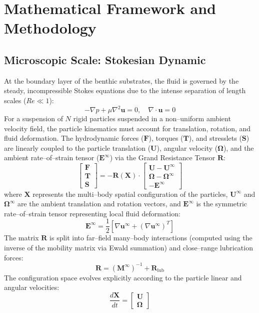 \section{Mathematical Framework and Methodology}
\label{sec:methodology}

\subsection{Microscopic Scale: Stokesian Dynamic}
At the boundary layer of the benthic substrates, the fluid is governed by the steady, incompressible Stokes equations due to the intense separation of length scales ($Re \ll 1$):
\begin{equation}
    -\nabla p + \mu \nabla^2 \bm{u} = 0, \quad \nabla \cdot \bm{u} = 0
\end{equation}
For a suspension of $N$ rigid particles suspended in a non--uniform ambient velocity field, the particle kinematics must account for translation, rotation, and fluid deformation. The hydrodynamic forces ($\bm{F}$), torques ($\bm{T}$), and stresslets ($\bm{S}$) are linearly coupled to the particle translation ($\bm{U}$), angular velocity ($\bm{\Omega}$), and the ambient rate--of--strain tensor ($\bm{E}^{\infty}$) via the Grand Resistance Tensor $\bm{R}$:
\begin{equation}
    \begin{bmatrix}
        \bm{F} \\
        \bm{T} \\
        \bm{S}
    \end{bmatrix} = -\bm{R}(\bm{X}) \cdot 
    \begin{bmatrix}
        \bm{U} - \bm{U}^{\infty} \\
        \bm{\Omega} - \bm{\Omega}^{\infty} \\
        -\bm{E}^{\infty}
    \end{bmatrix}
\end{equation}
where $\bm{X}$ represents the multi--body spatial configuration of the particles, $\bm{U}^{\infty}$ and $\bm{\Omega}^{\infty}$ are the ambient translation and rotation vectors, and $\bm{E}^{\infty}$ is the symmetric rate--of--strain tensor representing local fluid deformation:
\begin{equation}
    \bm{E}^{\infty} = \frac{1}{2} \left[ \nabla \bm{u}^{\infty} + (\nabla \bm{u}^{\infty})^T \right]
\end{equation}
The matrix $\bm{R}$ is split into far--field many--body interactions (computed using the inverse of the mobility matrix via Ewald summation) and close--range lubrication forces:
\begin{equation}
    \bm{R} = (\bm{M}^{\infty})^{-1} + \bm{R}_{\text{lub}}
\end{equation}
The configuration space evolves explicitly according to the particle linear and angular velocities:
\begin{equation}
    \frac{d\bm{X}}{dt} = \begin{bmatrix} \bm{U} \\ \bm{\Omega} \end{bmatrix}
\end{equation}

